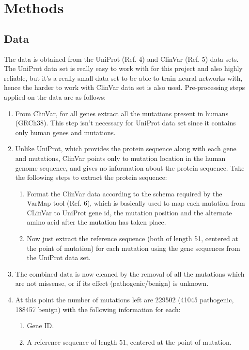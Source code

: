 \documentclass[twoside]{article}
\begin{document}
	
	\newpage
	
	\section{Methods}
	\subsection{Data}
	The data is obtained from the UniProt (Ref. 4) and ClinVar (Ref. 5) data sets. The UniProt data set is really easy to work with for this project and also highly reliable, but it's a really small data set to be able to train neural networks with, hence the harder to work with ClinVar data set is also used. Pre-processing steps applied on the data are as follows:
	\begin{enumerate}
		\item From ClinVar, for all genes extract all the mutations present in humans (GRCh38). This step isn't necessary for UniProt data set since it contains only human genes and mutations.
		\item Unlike UniProt, which provides the protein sequence along with each gene and mutations, ClinVar points only to mutation location in the human genome sequence, and gives no information about the protein sequence. Take the following steps to extract the protein sequence:
		\begin{enumerate}
			\item Format the ClinVar data according to the schema required by the VarMap tool (Ref. 6), which is basically used to map each mutation from CLinVar to UniProt gene id, the mutation position and the alternate amino acid after the mutation has taken place.
			\item Now just extract the reference sequence (both of length 51, centered at the point of mutation) for each mutation using the gene sequences from the UniProt data set.
		\end{enumerate}
		\item The combined data is now cleaned by the removal of all the mutations which are not missense, or if its effect (pathogenic/benign) is unknown.
		\item At this point the number of mutations left are 229502 (41045 pathogenic, 188457 benign) with the following information for each:
		\begin{enumerate}
			\item Gene ID.
			\item A reference sequence of length 51, centered at the point of mutation.

\end{enumerate}
\end{enumerate}
\end{document}
